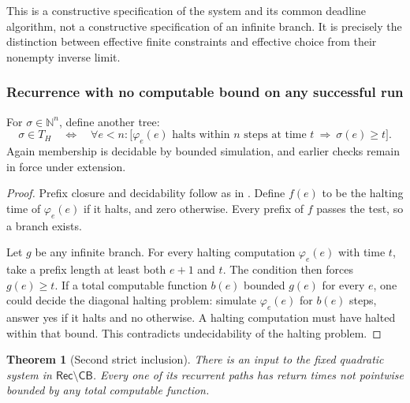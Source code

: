 \documentclass[11pt,letterpaper]{article}
\newtheorem{theorem}{Theorem}[section]
\newtheorem{lemma}[theorem]{Lemma}
\theoremstyle{definition}
\theoremstyle{remark}
\newcommand{\N}{\mathbb N}
\newcommand{\CB}{\mathsf{CB}}
\newcommand{\REC}{\mathsf{Rec}}
\newcommand{\1}{\mathbf 1}
\begin{document}
This is a constructive specification of the system and its common deadline
algorithm, not a constructive specification of an infinite branch. It is
precisely the distinction between effective finite constraints and effective
choice from their nonempty inverse limit.

\subsubsection{Recurrence with no computable bound on any successful run}

For $\sigma\in\N^n$, define another tree:
\begin{equation}\label{lbh:qd:eq:halttree}
 \sigma\in T_H\quad\Longleftrightarrow\quad
 \forall e<n:\bigl[
 \varphi_e(e)\text{ halts within }n\text{ steps at time }t
 \ \Longrightarrow\ \sigma(e)\geq t\bigr].
\end{equation}
Again membership is decidable by bounded simulation, and earlier checks
remain in force under extension.


\begin{proof}
Prefix closure and decidability follow as in . Define
$f(e)$ to be the halting time of $\varphi_e(e)$ if it halts, and zero
otherwise. Every prefix of $f$ passes the test, so a branch exists.

Let $g$ be any infinite branch. For every halting computation
$\varphi_e(e)$ with time $t$, take a prefix length at least both $e+1$ and
$t$. The condition then forces $g(e)\geq t$. If a total computable function
$b(e)$ bounded $g(e)$ for every $e$, one could decide the diagonal halting
problem: simulate $\varphi_e(e)$ for $b(e)$ steps, answer yes if it halts and
no otherwise. A halting computation must have halted within that bound.
This contradicts undecidability of the halting problem.
\end{proof}

\begin{theorem}[Second strict inclusion]\label{lbh:qd:thm:recnotcb}
There is an input to the fixed quadratic system in $\REC\setminus\CB$.
Every one of its recurrent paths has return times not pointwise bounded by
any total computable function.
\end{theorem}
\end{document}
